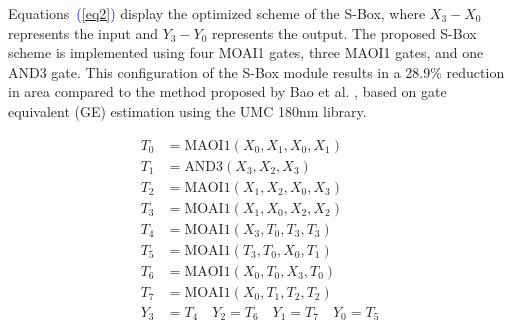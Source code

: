 \documentclass[final,5p,times,twocolumn]{elsarticle}
\begin{document}
Equations~\textcolor{blue}{(\ref{eq2})} display the optimized scheme of the S-Box, where $X_3-X_0$ represents the input and $Y_3-Y_0$ represents the output.
The proposed S-Box scheme is implemented using four MOAI1 gates, three MAOI1 gates, and one AND3 gate.
This configuration of the S-Box module results in a 28.9\% reduction in area compared to the method proposed by Bao et al. \cite{bao2019peigen}, based on gate equivalent (GE) estimation using the UMC 180nm library.

\begin{align}
    T_0 & = \text{MAOI1}(X_0, X_1, X_0, X_1) \nonumber            \\
    T_1 & = \text{AND3}(X_3, X_2, X_3) \nonumber                  \\
    T_2 & = \text{MAOI1}(X_1, X_2, X_0, X_3) \nonumber            \\
    T_3 & = \text{MOAI1}(X_1, X_0, X_2, X_2) \nonumber            \\
    T_4 & = \text{MOAI1}(X_3, T_0, T_3, T_3) \label{eq2}          \\
    T_5 & = \text{MOAI1}(T_3, T_0, X_0, T_1) \nonumber            \\
    T_6 & = \text{MAOI1}(X_0, T_0, X_3, T_0) \nonumber            \\
    T_7 & = \text{MOAI1}(X_0, T_1, T_2, T_2) \nonumber            \\
    Y_3 & = T_4 \quad Y_2 = T_6 \quad Y_1 = T_7 \quad  Y_0  = T_5
    \nonumber
\end{align}
\end{document}
